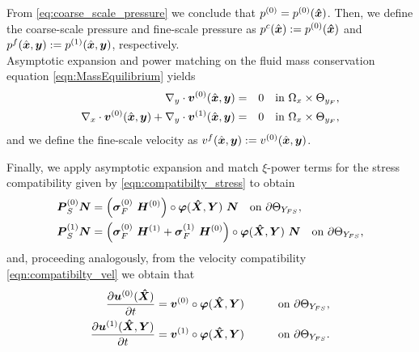 \documentclass[preprint,3p,12pt,number,sort&compress]{elsarticle}
\newcommand{\pd}[2]{\frac{\partial #1}{ \partial #2}}   %
\def\vec   #1{\text{\boldmath $#1$}{}}
\def\ten   #1{\text{\boldmath $#1$}{}}
\begin{document}
From \eqref{eq:coarse_scale_pressure} we conclude that $p^{(0)} = p^{(0)}(\vec{\hat x})$. Then, we  define the coarse-scale pressure and fine-scale pressure  as $p^{c}(\hat{\vec x}):=  p^{(0)}(\vec{\hat x})$ and $p^{f} (\hat{\vec x}, \vec y):= p^{(1)} (\hat{\vec x}, \vec y)$, respectively.\\ 
Asymptotic expansion and power matching on the fluid mass conservation equation \eqref{eqn:MassEquilibrium} yields
\begin{eqnarray}
	\nabla_y \cdot \vec v^{(0)}(\hat{\vec x}, \vec y)  &=& 0 \quad \mbox{in } \Omega_x \times\Theta_{y_F}, \label{eq:fine_scale_mass_conservation} \\
	 \nabla_x \cdot  \vec v^{(0)}(\hat{\vec x}, \vec y) +  \nabla_y \cdot \vec v^{(1)}(\hat{\vec x}, \vec y) &=& 0 \quad \mbox{in } \Omega_x \times\Theta_{y_F} ,\label{eq:coarse_scale_mass_conservation}
\end{eqnarray}
and we define the fine-scale velocity as $	v^{f} (\hat{\vec x}, \vec y) := v^{(0)} (\hat{\vec x}, \vec y)$. 

Finally, we apply asymptotic expansion and match $\xi$-power terms for the stress compatibility given by \eqref{eqn:compatibilty_stress} to obtain
\begin{align}
	 \ten P_S^{(0)} \vec N&= \left (\ten{\sigma}_F^{(0)} \    \ten H^{(0)} \right) \circ \vec \varphi(\vec{\hat X}, \vec Y) \ \vec N \quad \mbox{on $\partial \Theta_{Y_{FS}}$,}\\
	 \ten P_S^{(1)} \vec N&= \left(\ten{ \sigma}_F^{(0)}  \ \ten H^{{(1)}} + 
	\ten{{ \sigma}}_F^{(1)}  \ \ten H^{{(0)}} \right) \circ \vec \varphi(\vec{\hat X}, \vec Y) \  \vec N \quad  \mbox{on $\partial \Theta_{Y_{FS}}$},
\end{align}
and, proceeding analogously, from the velocity compatibility \eqref{eqn:compatibilty_vel} we obtain that 
\begin{align}
	\pd{\vec u^{(0)} (\vec {\hat X}) }{t} &= \vec v^{(0)} \circ \vec \varphi (\vec {\hat X}, \vec Y) \qquad &\mbox{on $\partial \Theta_{Y_{FS}}$,} \\
	\pd{\vec u^{(1)} (\vec{\hat X}, \vec Y) }{t} &= \vec v^{(1)} \circ \vec \varphi (\vec {\hat X}, \vec Y) \qquad &\mbox{on $\partial \Theta_{Y_{FS}}$} .
\end{align}
\end{document}
